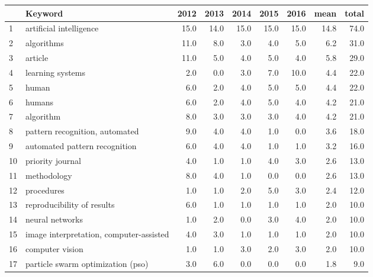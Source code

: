 \begin{tabular}{llrrrrrrr}
\toprule
{} &                                  Keyword &  2012 &  2013 &  2014 &  2015 &  2016 &  mean &  total \\
\midrule
1  &                  artificial intelligence &  15.0 &  14.0 &  15.0 &  15.0 &  15.0 &  14.8 &   74.0 \\
2  &                               algorithms &  11.0 &   8.0 &   3.0 &   4.0 &   5.0 &   6.2 &   31.0 \\
3  &                                  article &  11.0 &   5.0 &   4.0 &   5.0 &   4.0 &   5.8 &   29.0 \\
4  &                         learning systems &   2.0 &   0.0 &   3.0 &   7.0 &  10.0 &   4.4 &   22.0 \\
5  &                                    human &   6.0 &   2.0 &   4.0 &   5.0 &   5.0 &   4.4 &   22.0 \\
6  &                                   humans &   6.0 &   2.0 &   4.0 &   5.0 &   4.0 &   4.2 &   21.0 \\
7  &                                algorithm &   8.0 &   3.0 &   3.0 &   3.0 &   4.0 &   4.2 &   21.0 \\
8  &           pattern recognition, automated &   9.0 &   4.0 &   4.0 &   1.0 &   0.0 &   3.6 &   18.0 \\
9  &            automated pattern recognition &   6.0 &   4.0 &   4.0 &   1.0 &   1.0 &   3.2 &   16.0 \\
10 &                         priority journal &   4.0 &   1.0 &   1.0 &   4.0 &   3.0 &   2.6 &   13.0 \\
11 &                              methodology &   8.0 &   4.0 &   1.0 &   0.0 &   0.0 &   2.6 &   13.0 \\
12 &                               procedures &   1.0 &   1.0 &   2.0 &   5.0 &   3.0 &   2.4 &   12.0 \\
13 &               reproducibility of results &   6.0 &   1.0 &   1.0 &   1.0 &   1.0 &   2.0 &   10.0 \\
14 &                          neural networks &   1.0 &   2.0 &   0.0 &   3.0 &   4.0 &   2.0 &   10.0 \\
15 &  image interpretation, computer-assisted &   4.0 &   3.0 &   1.0 &   1.0 &   1.0 &   2.0 &   10.0 \\
16 &                          computer vision &   1.0 &   1.0 &   3.0 &   2.0 &   3.0 &   2.0 &   10.0 \\
17 &        particle swarm optimization (pso) &   3.0 &   6.0 &   0.0 &   0.0 &   0.0 &   1.8 &    9.0 \\

\end{tabular}
